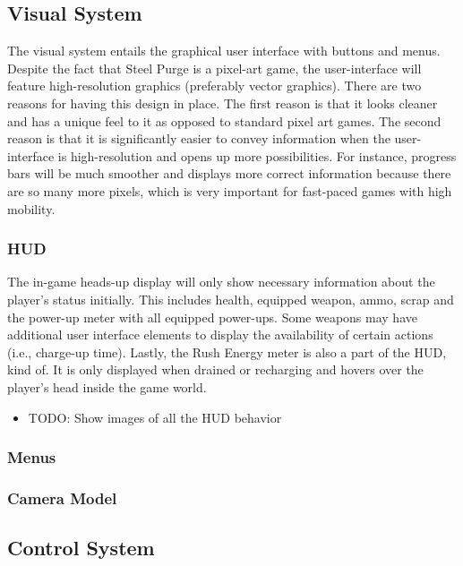 \documentclass[12pt]{article}
\begin{document}
\subsection{Visual System}

The visual system entails the graphical user interface with buttons and menus. Despite the fact that Steel Purge is a pixel-art game, the user-interface will feature high-resolution graphics (preferably vector graphics). There are two reasons for having this design in place. The first reason is that it looks cleaner and has a unique feel to it as opposed to standard pixel art games. The second reason is that it is significantly easier to convey information when the user-interface is high-resolution and opens up more possibilities. For instance, progress bars will be much smoother and displays more correct information because there are so many more pixels, which is very important for fast-paced games with high mobility. 

\subsubsection{HUD}

The in-game heads-up display will only show necessary information about the player's status initially. This includes health, equipped weapon, ammo, scrap and the power-up meter with all equipped power-ups. Some weapons may have additional user interface elements to display the availability of certain actions (i.e., charge-up time). Lastly, the Rush Energy meter is also a part of the HUD, kind of. It is only displayed when drained or recharging and hovers over the player's head inside the game world. 

\begin{itemize}
	\item TODO: Show images of all the HUD behavior
\end{itemize}

\subsubsection{Menus}

\subsubsection{Camera Model}

\subsection{Control System}
\end{document}
